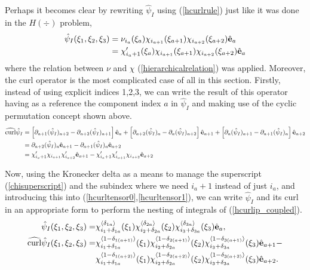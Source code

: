Perhaps it becomes clear by rewriting $\hat{\psi}_I$ using (\ref{hcurlrule}) just like it was done in the $H(\div)$ problem,
%
\begin{align}
    \hat{\psi}_I(\xi_1,\xi_2,\xi_3)&=\nu_{i_a}(\xi_a)\chi_{i_{a+1}}(\xi_{a+1})\chi_{i_{a+2}}(\xi_{a+2})\hat{\mathbf{e}}_a\nonumber\\
                                   &=\chi_{i_a+1}'(\xi_a)\chi_{i_{a+1}}(\xi_{a+1})\chi_{i_{a+2}}(\xi_{a+2})\hat{\mathbf{e}}_a   \label{hcurltensor0}
\end{align}
%
where the relation between $\nu$ and $\chi$ (\ref{hierarchicalrelation}) was applied. Moreover, the curl operator is the most complicated case of all in this section. Firstly, instead of using explicit indices 1,2,3, we can write the result of this operator having as a reference the component index $a$ in $\hat{\psi}_I$ and making use of the cyclic permutation concept shown above.
% 
\begin{align}
    \widehat{\operatorname{curl}}\hat{\psi}_I&= \left[\partial_{a+1}(\hat{\psi}_I)_{a+2}-\partial_{a+2}(\hat{\psi}_I)_{a+1}\right]\hat{\mathbf{e}}_{a}+  \left[\partial_{a+2}(\hat{\psi}_I)_{a}-\partial_{a}(\hat{\psi}_I)_{a+2}\right]\hat{\mathbf{e}}_{a+1}+ \left[\partial_{a}(\hat{\psi}_I)_{a+1}-\partial_{a+1}(\hat{\psi}_I)_{a}\right]\hat{\mathbf{e}}_{a+2}\nonumber\\
    &=\partial_{a+2}(\hat{\psi}_I)_{a}\hat{\mathbf{e}}_{a+1}-\partial_{a+1}(\hat{\psi}_I)_{a}\hat{\mathbf{e}}_{a+2}\nonumber\\
    &=\chi_{i_a+1}'\chi_{i_{a+1}}\chi_{i_{a+2}}'\hat{\mathbf{e}}_{a+1}-\chi_{i_a+1}'\chi_{i_{a+1}}'\chi_{i_{a+2}}\hat{\mathbf{e}}_{a+2}
    \label{hcurltensor1}
\end{align}

Now, using the Kronecker delta as a means to manage the superscript (\ref{chisuperscript}) and the subindex where we need $i_a+1$ instead of just $i_a$, and introducing this into (\ref{hcurltensor0},\ref{hcurltensor1}), we can write $\hat{\psi}_I$ and its curl in an appropriate form to perform the nesting of integrals of (\ref{hcurlip_coupled}).
% 
\begin{align}
\hat{\psi}_I(\xi_1,\xi_2,\xi_3)=&
\chi_{i_1+\delta_{1a}}^{\langle\delta_{1a}\rangle}(\xi_1)\chi_{i_2+\delta_{2a}}^{\langle\delta_{2a}\rangle}(\xi_2)\chi_{i_3+\delta_{3a}}^{\langle\delta_{3a}\rangle}(\xi_3)\hat{\mathbf{e}}_a, \label{curltensor0delta}\\
\widehat{\operatorname{curl}}\hat{\psi}_I(\xi_1,\xi_2,\xi_3)=& \chi_{i_1+\delta_{1a}}^{\langle1-\delta_{1(a+1)}\rangle}(\xi_1)\chi_{i_2+\delta_{2a}}^{\langle1-\delta_{2(a+1)}\rangle}(\xi_2)\chi_{i_3+\delta_{3a}}^{\langle1-\delta_{3(a+1)}\rangle}(\xi_3)\hat{\mathbf{e}}_{a+1}- \nonumber\\* &
\chi_{i_1+\delta_{1a}}^{\langle1-\delta_{1(a+2)}\rangle}(\xi_1)\chi_{i_2+\delta_{2a}}^{\langle1-\delta_{2(a+2)}\rangle}(\xi_2)\chi_{i_3+\delta_{3a}}^{\langle1-\delta_{3(a+2)}\rangle}(\xi_3)\hat{\mathbf{e}}_{a+2}. \label{curltensor1delta}
\end{align}

